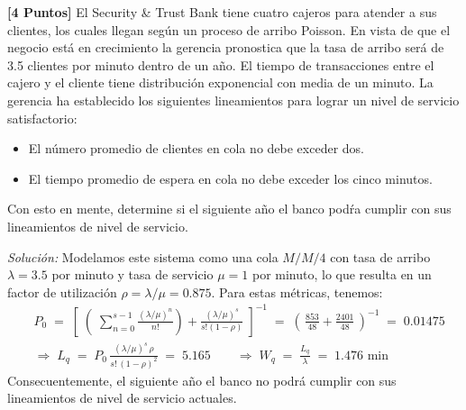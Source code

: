 \documentclass[ a4paper, twoside, 11pt]{article}
\begin{document}
\begin{problem}
\textbf{[4 Puntos]} El Security \& Trust Bank tiene cuatro cajeros para atender a sus clientes, los cuales llegan seg\'un un proceso de arribo Poisson. En vista de que el negocio est\'a en crecimiento la gerencia pronostica que la tasa de arribo ser\'a de 3.5 clientes por minuto dentro de un a\~no. El tiempo de transacciones entre el cajero y el cliente tiene distribuci\'on exponencial con media de un minuto. La gerencia ha establecido los siguientes lineamientos para lograr un nivel de servicio satisfactorio: 
\begin{itemize}
\item El n\'umero promedio de clientes en cola no debe exceder dos. 
\item El tiempo promedio de espera en cola no debe exceder los cinco minutos. 
\end{itemize}

Con esto en mente, determine si el siguiente a\~no el banco pod\'ra cumplir con sus lineamientos de nivel de servicio. 

\emph{Soluci\'on:} Modelamos este sistema como una cola $M/M/4$ con tasa de arribo $\lambda = 3.5$ por minuto y tasa de servicio $\mu = 1$ por minuto, lo que resulta en un factor de utilizaci\'on $\rho = \lambda / \mu = 0.875$. Para estas m\'etricas, tenemos: 
\begin{align*}
& P_0 \; = \;
\left[ \; \left( \;
\sum_{n=0}^{s-1} \frac{(\lambda/\mu)^n}{n!} \right)
+ \frac{(\lambda/\mu)^s}{s!(1-\rho)} \; \right]^{-1} \; = \; 
\left( \, \frac{853}{48} + \frac{2401}{48} \, \right)^{-1} \; = \; 0.01475 \\[2ex]
& \Longrightarrow \; L_q \; = \; 
P_0 \, \frac{(\lambda/\mu)^s \, \rho}{ s! \, (1-\rho)^2 } \; = \; 5.165 \qquad \Longrightarrow
\; W_q \; = \; \frac{L_q}{\lambda} \; = \; 1.476 \text{ min}
\end{align*}
Consecuentemente, el siguiente a\~no el banco no podr\'a cumplir con sus lineamientos de nivel de servicio actuales. 

\end{problem}
\vspace{\baselineskip}
\end{document}
